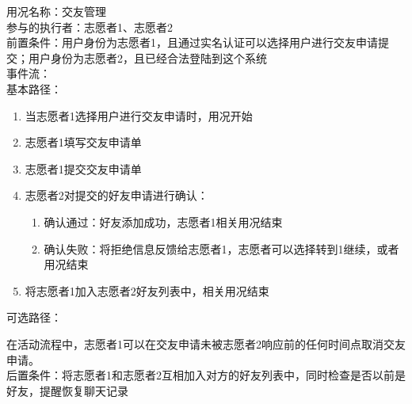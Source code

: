 
\begin{framed}
\noindent
用况名称：交友管理\\
参与的执行者：志愿者1、志愿者2\\
前置条件：用户身份为志愿者1，且通过实名认证可以选择用户进行交友申请提交；用户身份为志愿者2，且已经合法登陆到这个系统\\
事件流：\\
基本路径：
\begin{enumerate}[itemsep=2pt,topsep=0pt,parsep=0pt,itemindent=1em]
    \item 当志愿者1选择用户进行交友申请时，用况开始
    \item 志愿者1填写交友申请单
    \item 志愿者1提交交友申请单
    \item 志愿者2对提交的好友申请进行确认：
    \begin{enumerate}[itemsep=2pt,topsep=0pt,parsep=0pt,itemindent=1em]
          \item 确认通过：好友添加成功，志愿者1相关用况结束
          \item 确认失败：将拒绝信息反馈给志愿者1，志愿者可以选择转到1继续，或者用况结束
      \end{enumerate}
    \item 将志愿者1加入志愿者2好友列表中，相关用况结束
\end{enumerate}
\noindent
可选路径：\par
    在活动流程中，志愿者1可以在交友申请未被志愿者2响应前的任何时间点取消交友申请。\\
后置条件：将志愿者1和志愿者2互相加入对方的好友列表中，同时检查是否以前是好友，提醒恢复聊天记录
\end{framed}

